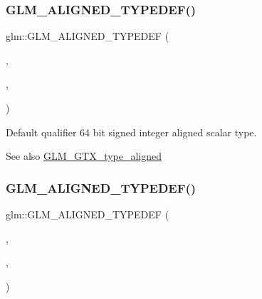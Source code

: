 \subsubsection{\texorpdfstring{G\+L\+M\+\_\+\+A\+L\+I\+G\+N\+E\+D\+\_\+\+T\+Y\+P\+E\+D\+E\+F()}{GLM\_ALIGNED\_TYPEDEF()}\hspace{0.1cm}{\footnotesize\ttfamily [40/209]}}
{\footnotesize\ttfamily glm\+::\+G\+L\+M\+\_\+\+A\+L\+I\+G\+N\+E\+D\+\_\+\+T\+Y\+P\+E\+D\+EF (\begin{DoxyParamCaption}\item[{\hyperlink{group__gtc__type__precision_ga435d75819cce297cc5fa21bd84ef89a5}{int64}}]{,  }\item[{aligned\+\_\+int64}]{,  }\item[{8}]{ }\end{DoxyParamCaption})}

Default qualifier 64 bit signed integer aligned scalar type. \begin{DoxySeeAlso}{See also}
\hyperlink{group__gtx__type__aligned}{G\+L\+M\+\_\+\+G\+T\+X\+\_\+type\+\_\+aligned} 
\end{DoxySeeAlso}
\mbox{\label{group__gtx__type__aligned_ga848aedf13e2d9738acf0bb482c590174}} 
\subsubsection{\texorpdfstring{G\+L\+M\+\_\+\+A\+L\+I\+G\+N\+E\+D\+\_\+\+T\+Y\+P\+E\+D\+E\+F()}{GLM\_ALIGNED\_TYPEDEF()}\hspace{0.1cm}{\footnotesize\ttfamily [41/209]}}
{\footnotesize\ttfamily glm\+::\+G\+L\+M\+\_\+\+A\+L\+I\+G\+N\+E\+D\+\_\+\+T\+Y\+P\+E\+D\+EF (\begin{DoxyParamCaption}\item[{\hyperlink{group__gtc__type__precision_ga673898d450b2a91186f3c4f40c5f8633}{int8\+\_\+t}}]{,  }\item[{aligned\+\_\+int8\+\_\+t}]{,  }\item[{1}]{ }\end{DoxyParamCaption})}

